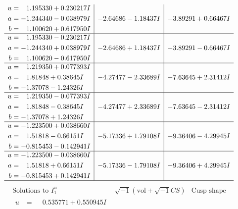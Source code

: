 \documentclass[1p]{elsarticle_modified}
\theoremstyle{definition}
\newcommand{\I}{\sqrt{-1}}
\begin{document}
$$\begin{array}{c|c|c}
\begin{aligned}
u &= \phantom{-}1.195330 + 0.230217 I \\
a &= -1.244340 - 0.038979 I \\
b &= \phantom{-}1.100620 + 0.617950 I\end{aligned}
 & -2.64686 - 1.18437 I & -3.89291 + 0.66467 I \\ \hline\begin{aligned}
u &= \phantom{-}1.195330 - 0.230217 I \\
a &= -1.244340 + 0.038979 I \\
b &= \phantom{-}1.100620 - 0.617950 I\end{aligned}
 & -2.64686 + 1.18437 I & -3.89291 - 0.66467 I \\ \hline\begin{aligned}
u &= \phantom{-}1.219350 + 0.077393 I \\
a &= \phantom{-}1.81848 + 0.38645 I \\
b &= -1.37078 - 1.24326 I\end{aligned}
 & -4.27477 - 2.33689 I & -7.63645 + 2.31412 I \\ \hline\begin{aligned}
u &= \phantom{-}1.219350 - 0.077393 I \\
a &= \phantom{-}1.81848 - 0.38645 I \\
b &= -1.37078 + 1.24326 I\end{aligned}
 & -4.27477 + 2.33689 I & -7.63645 - 2.31412 I \\ \hline\begin{aligned}
u &= -1.223500 + 0.038660 I \\
a &= \phantom{-}1.51818 - 0.66151 I \\
b &= -0.815453 - 0.142941 I\end{aligned}
 & -5.17336 + 1.79108 I & -9.36406 - 4.29945 I \\ \hline\begin{aligned}
u &= -1.223500 - 0.038660 I \\
a &= \phantom{-}1.51818 + 0.66151 I \\
b &= -0.815453 + 0.142941 I\end{aligned}
 & -5.17336 - 1.79108 I & -9.36406 + 4.29945 I\\
 \hline 
 \end{array}$$\newpage$$\begin{array}{c|c|c}  
\text{Solutions to }I^u_{1}& \I (\text{vol} + \sqrt{-1}CS) & \text{Cusp shape}\\
 \hline 
\begin{aligned}
u &= \phantom{-}0.535771 + 0.550945 I \\

\end{aligned}
\end{array}$$
\end{document}
